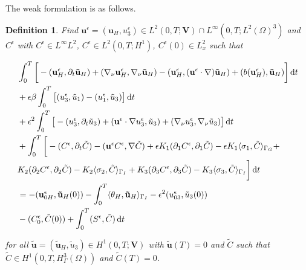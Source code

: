 \documentclass[11pt]{article}
\newtheorem{definition}{Definition}
\newcommand*\diff{\mathop{}\!\mathrm{d}}
\begin{document}
The weak formulation is as follows.

\begin{definition}
Find $\mathbf{u}^\epsilon = (\mathbf{u}_H, u^\epsilon_3) \in L^2 (0,T ; \mathbf{V}) \cap L^\infty (0, T; L^2 (\Omega)^3)$ and $C^\epsilon$ with $C^\epsilon \in L^\infty L^2$, $C^\epsilon \in L^2 (0,T; H^1)$, $C^\epsilon(0) \in L^2_x$ such that

  \begin{equation}
    \begin{split}
      & \int_0^T \bigg [ -(\mathbf{u}^\epsilon_H, \partial_t \mathbf{\tilde{u}}_H) + (\nabla_\nu \mathbf{u}^\epsilon_H, \nabla_\nu \mathbf{\tilde{u}}_H) - (\mathbf{u}^\epsilon_H, (\mathbf{u}^\epsilon \cdot \nabla) \mathbf{\tilde{u}}_H) + (b(\mathbf{u}^\epsilon_H), \mathbf{\tilde{u}}_H) \bigg ] \diff t \\
      & + \epsilon \beta \int_0 ^ T \big [ (u_3 ^\epsilon, \tilde{u}_1) - (u_1^\epsilon, \tilde{u}_3) \big ] \diff t\\
      & + \epsilon^2 \int _0 ^ T \big [ -(u_3^\epsilon, \partial_t \tilde{u}_3) +(\mathbf{u}^\epsilon \cdot \nabla u_3 ^ \epsilon, \tilde{u}_3) + (\nabla_\nu u_3^\epsilon, \nabla_\nu \tilde{u}_3) \big ] \diff t \\
      &+ \int_0^T \bigg [ -(C^\epsilon, \partial_t \tilde{C}) -(\mathbf{u}^\epsilon C^\epsilon, \nabla \tilde{C}) + \epsilon K_1 (\partial_1 C^\epsilon, \partial_1 \tilde{C}) - \epsilon K_1 \langle \sigma_1 , \tilde{C} \rangle _{\Gamma_G} + \\
      & K_2 (\partial_2 C^\epsilon, \partial_2 \tilde{C}) - K_2 \langle \sigma_2 , \tilde{C} \rangle_{\Gamma_I} + K_3 (\partial_3 C^\epsilon, \partial_3 \tilde{C}) - K_3 \langle\sigma_3 , \tilde{C} \rangle_{\Gamma_I} \bigg ] \diff t \\
      & = - (\mathbf{u}^\epsilon_{0H}, \mathbf{\tilde{u}}_H(0)) - \int_0^T \langle \theta_H, \mathbf{\tilde{u}}_H \rangle_{\Gamma_I} - \epsilon^2 (u_{03}^\epsilon, \tilde{u}_3 (0)) \\
      & - (C_0^\epsilon, \tilde{C} (0)) + \int_0^T (S^\epsilon,\tilde{C}) \diff t \raisetag{50pt} \label{coastalAnisotropic}
    \end{split}
  \end{equation}
  
   for all $\mathbf{\tilde{u}} = (\mathbf{\tilde{u}}_H, \tilde{u}_3) \in H^1 (0,T;\mathbf{V})$ with $\mathbf{\tilde{u}}(T) = 0$ and $\tilde{C}$ such that $\tilde{C} \in H^1 (0,T, H^3_{\Gamma} (\Omega))$ and $\tilde{C} (T) = 0$.

\end{definition}
\end{document}
